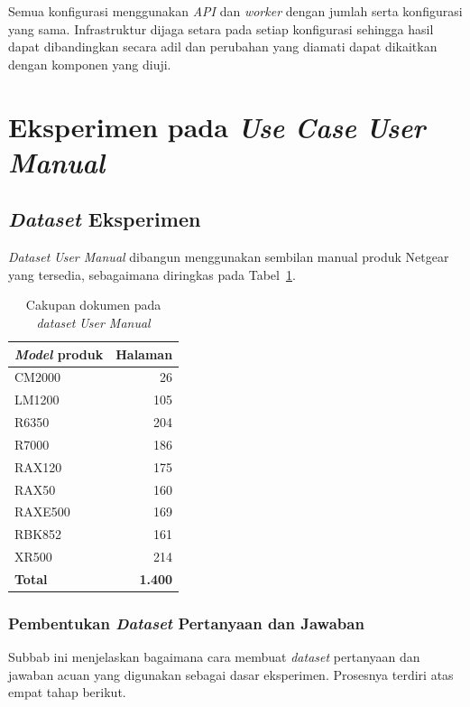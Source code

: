 Semua konfigurasi menggunakan \emph{API} dan \emph{worker} dengan jumlah serta konfigurasi yang
sama. Infrastruktur dijaga setara pada setiap konfigurasi sehingga hasil dapat dibandingkan
secara adil dan perubahan yang diamati dapat dikaitkan dengan komponen yang diuji.

\section{Eksperimen pada \emph{Use Case} \emph{User Manual}}
\label{sec:eksperimen-user-manual}

\subsection{\emph{Dataset} Eksperimen}
\label{subsec:dataset-user-manual}

\emph{Dataset} \emph{User Manual} dibangun menggunakan sembilan manual produk Netgear yang
tersedia, sebagaimana diringkas pada Tabel~\ref{tab:customer-corpus-coverage}.

\begin{table}[H]
\centering
\small
\caption{Cakupan dokumen pada \emph{dataset} \emph{User Manual}}
\label{tab:customer-corpus-coverage}
\begin{tabularx}{0.75\textwidth}{@{}>{\RaggedRight\arraybackslash}X r@{}}
\toprule
\textbf{\emph{Model} produk} & \textbf{Halaman}\\
\midrule
CM2000 & 26\\
LM1200 & 105\\
R6350 & 204\\
R7000 & 186\\
RAX120 & 175\\
RAX50 & 160\\
RAXE500 & 169\\
RBK852 & 161\\
XR500 & 214\\
\midrule
\textbf{Total} & \textbf{1.400}\\
\bottomrule
\end{tabularx}
\end{table}

\subsubsection{Pembentukan \emph{Dataset} Pertanyaan dan Jawaban}
\label{subsubsec:user-manual-question-dataset}

Subbab ini menjelaskan bagaimana cara membuat \emph{dataset} pertanyaan dan jawaban acuan
yang digunakan sebagai dasar eksperimen. Prosesnya terdiri atas empat tahap berikut.

